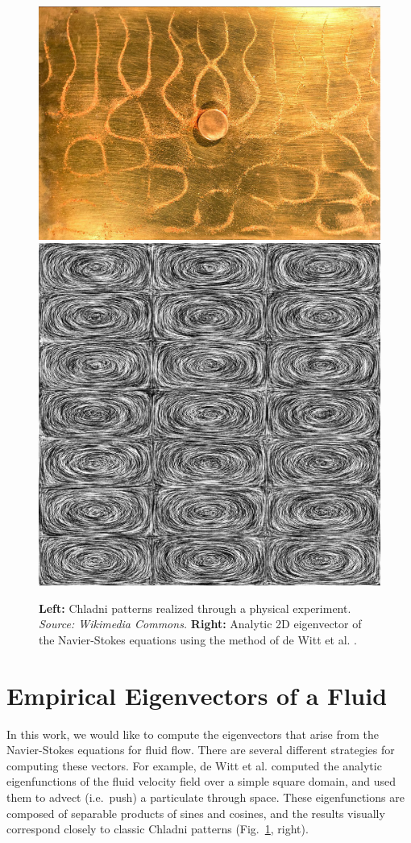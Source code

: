 \documentclass[11pt]{article}
\begin{document}
\begin{figure}
		\centering
		\includegraphics[height=0.3\textwidth]{Figures/chladni_plate.jpg}
		\includegraphics[height=0.3\textwidth]{Figures/LIC.jpg}
		\caption{{\bf Left:} Chladni patterns realized through a physical experiment. {\em Source: Wikimedia Commons.} {\bf Right:} Analytic 2D eigenvector of the Navier-Stokes equations using the method of de Witt et al. \cite{deWitt:2012}.}
		\label{fig:chladni-plate}
\end{figure}

\section*{Empirical Eigenvectors of a Fluid}

In this work, we would like to compute the eigenvectors that arise from the Navier-Stokes equations for fluid flow. There are several different strategies for computing these vectors. For example, de Witt et al. \cite{deWitt:2012} computed the analytic eigenfunctions of the fluid velocity field over a simple square domain, and used them to advect (i.e.~push) a particulate through space. These eigenfunctions are composed of separable products of sines and cosines, and the results visually correspond closely to classic Chladni patterns (Fig.~\ref{fig:chladni-plate}, right).
\end{document}
